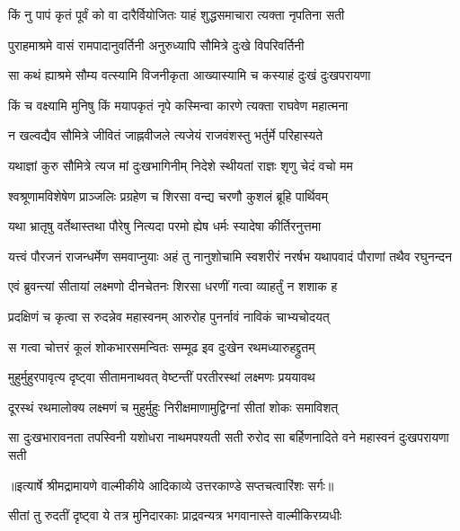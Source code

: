 \twolineshloka
{किं नु पापं कृतं पूर्वं को वा दारैर्वियोजितः}
{याहं शुद्धसमाचारा त्यक्ता नृपतिना सती} %

\twolineshloka
{पुराहमाश्रमे वासं रामपादानुवर्तिनी}
{अनुरुध्यापि सौमित्रे दुःखे विपरिवर्तिनी} %

\twolineshloka
{सा कथं ह्याश्रमे सौम्य वत्स्यामि विजनीकृता}
{आख्यास्यामि च कस्याहं दुःखं दुःखपरायणा} %

\twolineshloka
{किं च वक्ष्यामि मुनिषु किं मयापकृतं नृपे}
{कस्मिन्वा कारणे त्यक्ता राघवेण महात्मना} %

\twolineshloka
{न खल्वद्यैव सौमित्रे जीवितं जाह्नवीजले}
{त्यजेयं राजवंशस्तु भर्तुर्मे परिहास्यते} %

\twolineshloka
{यथाज्ञां कुरु सौमित्रे त्यज मां दुःखभागिनीम्}
{निदेशे स्थीयतां राज्ञः शृणु चेदं वचो मम} %

\twolineshloka
{श्वश्रूणामविशेषेण प्राञ्जलिः प्रग्रहेण च}
{शिरसा वन्द्य चरणौ कुशलं ब्रूहि पार्थिवम्} %

\twolineshloka
{यथा भ्रातृषु वर्तेथास्तथा पौरेषु नित्यदा}
{परमो ह्येष धर्मः स्यादेषा कीर्तिरनुत्तमा} %

\threelineshloka
{यत्त्वं पौरजनं राजन्धर्मेण समवाप्नुयाः}
{अहं तु नानुशोचामि स्वशरीरं नरर्षभ}
{यथापवादं पौराणां तथैव रघुनन्दन} %

\twolineshloka
{एवं ब्रुवन्त्यां सीतायां लक्ष्मणो दीनचेतनः}
{शिरसा धरणीं गत्वा व्याहर्तुं न शशाक ह} %

\twolineshloka
{प्रदक्षिणं च कृत्वा स रुदन्नेव महास्वनम्}
{आरुरोह पुनर्नावं नाविकं चाभ्यचोदयत्} %

\twolineshloka
{स गत्वा चोत्तरं कूलं शोकभारसमन्वितः}
{सम्मूढ इव दुःखेन रथमध्यारुहद्द्रुतम्} %

\twolineshloka
{मुहुर्मुहुरपावृत्य दृष्ट्वा सीतामनाथवत्}
{वेष्टन्तीं परतीरस्थां लक्ष्मणः प्रययावथ} %

\twolineshloka
{दूरस्थं रथमालोक्य लक्ष्मणं च मुहुर्मुहुः}
{निरीक्षमाणामुद्विग्नां सीतां शोकः समाविशत्} %

\fourlineindentedshloka
{सा दुःखभारावनता तपस्विनी}
{यशोधरा नाथमपश्यती सती}
{रुरोद सा बर्हिणनादिते वने}
{महास्वनं दुःखपरायणा सती} %


{॥इत्यार्षे श्रीमद्रामायणे वाल्मीकीये आदिकाव्ये उत्तरकाण्डे सप्तचत्वारिंशः सर्गः॥}


\twolineshloka
{सीतां तु रुदतीं दृष्ट्वा ये तत्र मुनिदारकाः}
{प्राद्रवन्यत्र भगवानास्ते वाल्मीकिरग्र्यधीः} %

